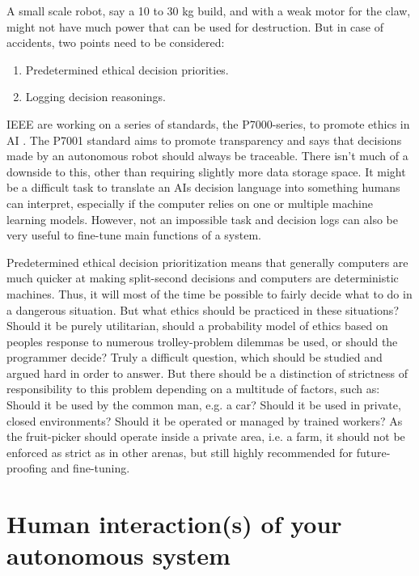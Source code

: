 \documentclass[%
oneside,    %
project,    %
nosummary   %
]{USN-MSc}
\begin{document}
A small scale robot, say a 10 to 30 kg build, and with a weak motor for the claw, might not have much power that can be used for destruction. 
But in case of accidents, two points need to be considered: 
\begin{enumerate}
  \item Predetermined ethical decision priorities.
  \item Logging decision reasonings.
\end{enumerate}

IEEE are working on a series of standards, the P7000-series, to promote ethics in AI \cite{7924235}. 
The P7001 standard aims to promote transparency and says that decisions made by an autonomous robot should always be traceable. There isn't much of a downside to this, other than requiring slightly more data storage space. It might be a difficult task to translate an AIs decision language into something humans can interpret, especially if the computer relies on one or multiple machine learning models. However, not an impossible task and decision logs can also be very useful to fine-tune main functions of a system.

Predetermined ethical decision prioritization means that generally computers are much quicker at making split-second decisions and computers are deterministic machines. Thus, it will most of the time be possible to fairly decide what to do in a dangerous situation. But what ethics should be practiced in these situations? Should it be purely utilitarian, should a probability model of ethics based on peoples response to numerous trolley-problem dilemmas be used, or should the programmer decide? Truly a difficult question, which should be studied and argued hard in order to answer. But there should be a distinction of strictness of responsibility to this problem depending on a multitude of factors, such as: Should it be used by the common man, e.g. a car? Should it be used in private, closed environments? Should it be operated or managed by trained workers? As the fruit-picker should operate inside a private area, i.e. a farm, it should not be enforced as strict as in other arenas, but still highly recommended for future-proofing and fine-tuning.

\chapter{Human interaction(s) of your autonomous system}
\label{ch:human}
\end{document}
